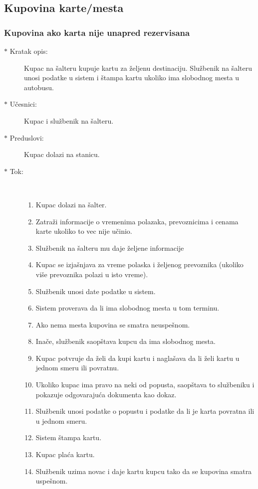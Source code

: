 \subsection{Kupovina karte/mesta}
\subsubsection{Kupovina ako karta nije unapred rezervisana}
\begin{description}
	\item[$\ast$ Kratak opis: ] Kupac na \v salteru kupuje kartu za \v zeljenu destinaciju. Slu\v zbenik na \v salteru unosi podatke u sistem i \v stampa kartu ukoliko ima slobodnog mesta u autobusu.
	\item[$\ast$ U\v cesnici: ] Kupac i slu\v zbenik na \v salteru.
	\item[$\ast$ Preduslovi: ] Kupac dolazi na stanicu.
	\item[$\ast$ Tok: ] \ \\
	\begin{enumerate}
		\item Kupac dolazi na \v salter.
		\item Zatra\v zi informacije o vremenima polazaka, prevoznicima i cenama karte ukoliko to vec nije u\v cinio.
		\item Slu\v zbenik na \v salteru mu daje \v zeljene informacije
		\item Kupac se izja\v snjava za vreme polaska i \v zeljenog prevoznika (ukoliko vi\v se prevoznika polazi u isto vreme).
		\item Slu\v zbenik unosi date podatke u sistem.
		\item Sistem proverava da li ima slobodnog mesta u tom terminu.
		\item Ako nema mesta kupovina se smatra neuspe\v snom.
		\item Ina\v ce, slu\v zbenik saop\v stava kupcu da ima slobodnog mesta.
		\item Kupac potvr\dj{}uje da \v zeli da kupi kartu i nagla\v sava da li \v zeli kartu u jednom smeru ili povratnu.
		\item Ukoliko kupac ima pravo na neki od popusta, saop\v stava to slu\v zbeniku i pokazuje odgovaraju\'ca dokumenta kao dokaz.
		\item Slu\v zbenik unosi podatke o popustu i podatke da li je karta povratna ili u jednom smeru.
		\item Sistem \v stampa kartu.
		\item Kupac pla\' ca kartu.
		\item Slu\v zbenik uzima novac i daje kartu kupcu tako da se kupovina smatra uspe\v snom.
	\end{enumerate}
\end{description}

